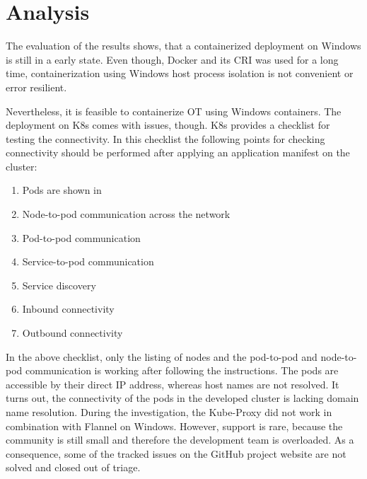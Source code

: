 \section{Analysis}
The evaluation of the results shows, that a containerized deployment on \ac{Windows} is still in a early state. Even though, Docker and its \ac{CRI} was used for a long time, containerization using \ac{Windows} host process isolation is not convenient or error resilient.

Nevertheless, it is feasible to containerize \ac{OT} using \ac{Windows} containers. The deployment on \ac{K8s} comes with issues, though.
\ac{K8s} provides a checklist for testing the connectivity\cite{Kubernetes.20221205}. In this checklist the following points for checking connectivity should be performed after applying an application manifest on the cluster:
\begin{enumerate}
	\item Pods are shown in \cite{Kubernetes.20221205}
	\item Node-to-pod communication across the network\cite{Kubernetes.20221205}
	\item Pod-to-pod communication\cite{Kubernetes.20221205}
	\item Service-to-pod communication\cite{Kubernetes.20221205}
	\item Service discovery\cite{Kubernetes.20221205}
	\item Inbound connectivity\cite{Kubernetes.20221205}
	\item Outbound connectivity\cite{Kubernetes.20221205}
\end{enumerate}

In the above checklist, only the listing of nodes and the pod-to-pod and node-to-pod communication is working after following the instructions. The pods are accessible by their direct \ac{IP} address, whereas host names are not resolved. It turns out, the connectivity of the pods in the developed cluster is lacking domain name resolution. During the investigation, the Kube-Proxy did not work in combination with Flannel on \ac{Windows}.
However, support is rare, because the community is still small and therefore the development team is overloaded\cite{GitHub.2023, GitHub.2022}. As a consequence, some of the tracked issues on the GitHub project website are not solved and closed out of triage\cite{GitHub.2023, GitHub.2022}.

